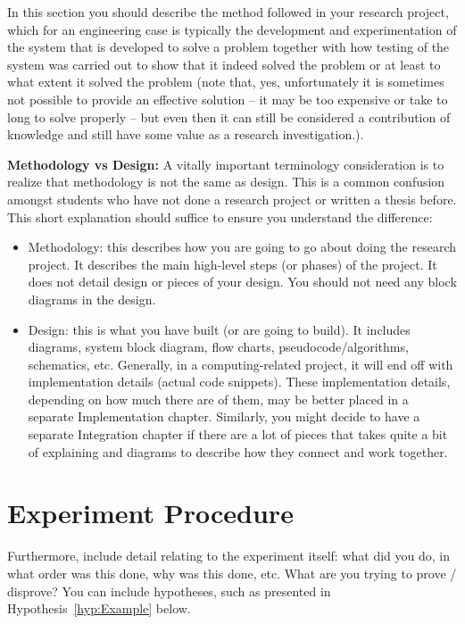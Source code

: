 
In this section you should describe the method followed in your research project, which for an engineering case is typically the development and experimentation of the system that is developed to solve a problem together with how testing of the system was carried out to show that it indeed solved the problem or at least to what extent it solved the problem (note that, yes, unfortunately it is sometimes not possible to provide an effective solution -- it may be too expensive or take to long to solve properly -- but even then it can still be considered a contribution of knowledge and still have some value as a research investigation.).

\textbf{Methodology vs Design:} A vitally important terminology consideration is to realize that  methodology is not the same as design. This is a common confusion amongst students who have not done a research project or written a thesis before. This short explanation should suffice to ensure you understand the difference:

\begin{itemize}
	\item Methodology: this describes how you are going to go about doing the research project. It describes the main high-level steps (or phases) of the project. It does not detail design or pieces of your design. You should not need any block diagrams in the design.
	\item Design: this is what you have built (or are going to build). It includes diagrams, system block diagram, flow charts, pseudocode/algorithms, schematics, etc. Generally, in a computing-related project, it will end off with implementation details (actual code snippets). These implementation details, depending on how much there are of them, may be better placed in a separate Implementation chapter. Similarly, you might decide to have a separate Integration chapter if there are a lot of pieces that takes quite a bit of explaining and diagrams to describe how they connect and work together. 
\end{itemize}



\section{Experiment Procedure}

Furthermore, include detail relating to the experiment itself: what did you do, in what order was this done, why was this done, etc.  What are you trying to prove / disprove?  You can include hypotheses, such as presented in Hypothesis~\ref{hyp:Example} below.

